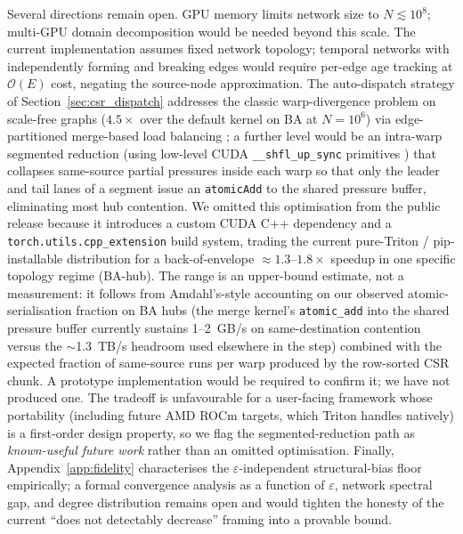 \documentclass[a4paper,fleqn]{cas-sc}
\theoremstyle{definition}
\theoremstyle{remark}
\newcommand{\bigO}{\mathcal{O}}
\begin{document}
Several directions remain open. GPU memory limits network size to $N \lesssim 10^8$; multi-GPU domain decomposition would be needed beyond this scale. The current implementation assumes fixed network topology; temporal networks with independently forming and breaking edges would require per-edge age tracking at $\bigO(E)$ cost, negating the source-node approximation. The auto-dispatch strategy of Section~\ref{sec:csr_dispatch} addresses the classic warp-divergence problem on scale-free graphs ($4.5\times$ over the default kernel on BA at $N = 10^6$) via edge-partitioned merge-based load balancing \citep{merrill2016merge}; a further level would be an intra-warp segmented reduction (using low-level CUDA \texttt{\_\_shfl\_up\_sync} primitives \citep{nvidia2024cudagraphs}) that collapses same-source partial pressures inside each warp so that only the leader and tail lanes of a segment issue an \texttt{atomicAdd} to the shared pressure buffer, eliminating most hub contention. We omitted this optimisation from the public release because it introduces a custom CUDA C++ dependency and a \texttt{torch.utils.cpp\_extension} build system, trading the current pure-Triton / pip-installable distribution for a back-of-envelope $\approx 1.3$--$1.8\times$ speedup in one specific topology regime (BA-hub). The range is an upper-bound estimate, not a measurement: it follows from Amdahl's-style accounting on our observed atomic-serialisation fraction on BA hubs (the merge kernel's \texttt{atomic\_add} into the shared pressure buffer currently sustains 1--2~GB/s on same-destination contention versus the $\sim$1.3~TB/s headroom used elsewhere in the step) combined with the expected fraction of same-source runs per warp produced by the row-sorted CSR chunk. A prototype implementation would be required to confirm it; we have not produced one. The tradeoff is unfavourable for a user-facing framework whose portability (including future AMD ROCm targets, which Triton handles natively) is a first-order design property, so we flag the segmented-reduction path as \emph{known-useful future work} rather than an omitted optimisation. Finally, Appendix~\ref{app:fidelity} characterises the $\varepsilon$-independent structural-bias floor empirically; a formal convergence analysis as a function of $\varepsilon$, network spectral gap, and degree distribution remains open and would tighten the honesty of the current ``does not detectably decrease'' framing into a provable bound.

\end{document}
